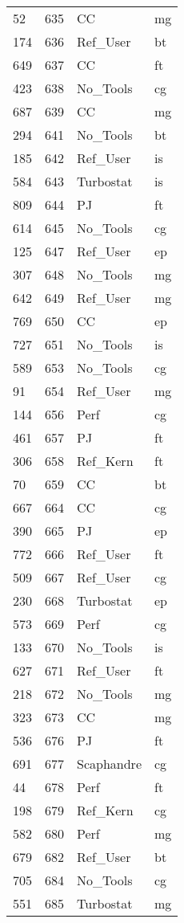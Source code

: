 \begin{tabular}{lrll}
52 & 635 & CC & mg \\
174 & 636 & Ref_User & bt \\
649 & 637 & CC & ft \\
423 & 638 & No_Tools & cg \\
687 & 639 & CC & mg \\
294 & 641 & No_Tools & bt \\
185 & 642 & Ref_User & is \\
584 & 643 & Turbostat & is \\
809 & 644 & PJ & ft \\
614 & 645 & No_Tools & cg \\
125 & 647 & Ref_User & ep \\
307 & 648 & No_Tools & mg \\
642 & 649 & Ref_User & mg \\
769 & 650 & CC & ep \\
727 & 651 & No_Tools & is \\
589 & 653 & No_Tools & cg \\
91 & 654 & Ref_User & mg \\
144 & 656 & Perf & cg \\
461 & 657 & PJ & ft \\
306 & 658 & Ref_Kern & ft \\
70 & 659 & CC & bt \\
667 & 664 & CC & cg \\
390 & 665 & PJ & ep \\
772 & 666 & Ref_User & ft \\
509 & 667 & Ref_User & cg \\
230 & 668 & Turbostat & ep \\
573 & 669 & Perf & cg \\
133 & 670 & No_Tools & is \\
627 & 671 & Ref_User & ft \\
218 & 672 & No_Tools & mg \\
323 & 673 & CC & mg \\
536 & 676 & PJ & ft \\
691 & 677 & Scaphandre & cg \\
44 & 678 & Perf & ft \\
198 & 679 & Ref_Kern & cg \\
582 & 680 & Perf & mg \\
679 & 682 & Ref_User & bt \\
705 & 684 & No_Tools & cg \\
551 & 685 & Turbostat & mg \\

\end{tabular}
